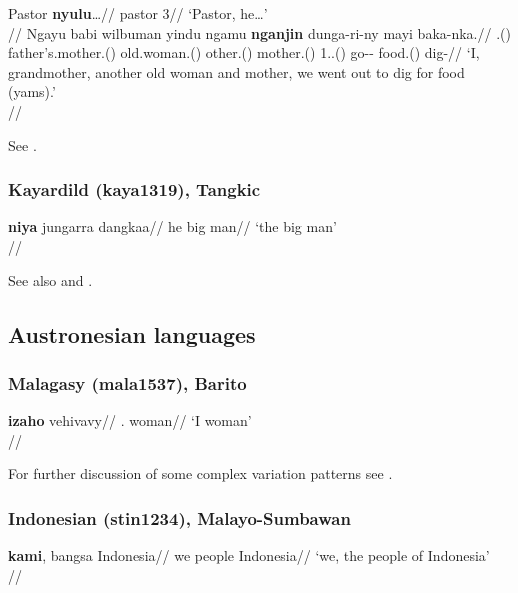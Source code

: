 \pex
\a 
\begingl
\gla Pastor \textbf{nyulu}\ldots//
\glb pastor 3\Sg{}//
\glft `Pastor, he\ldots'\\{\citep[after][202, (611); gloss extrapolated]{patz2002}}//
\endgl
\a
\begingl
\gla Ngayu babi wilbuman yindu ngamu \textbf{nganjin} dunga-ri-ny mayi baka-nka.//
\Sg{}.\Nom{}(\Sarg{}) father's.mother.\Abs{}(\Sarg) old.woman.\Abs{}(\Sarg{}) other.\Abs{}(\Sarg{}) mother.\Abs{}(\Sarg{}) 1\Pl{}.\Excl{}.\Nom{}(\Sarg{}) go-\Pl{}-\Pst{} food.\Abs{}(\Obj{}) dig-\Purp//
\glft `I, grandmother, another old woman and mother, we went out to dig for food (yams).' \\{\citep[after][203, (618)]{patz2002}}//
\endgl
\xe

See \citet[120f., 202f.]{patz2002}.

\subsubsection{Kayardild (kaya1319), Tangkic}

\ex
\begingl
\gla \textbf{niya} jungarra dangkaa//
\glb he big man//
\glft `the big man'\\\citep[239]{evans1995}//
\endgl
\xe

See also \citet[239; 251]{evans1995} and \citet[141]{round2013}.


\subsection{Austronesian languages}

\subsubsection{Malagasy (mala1537), Barito}

\ex
\begingl
\gla \textbf{izaho} vehivavy//
\Sg.\Def{} woman//
\glft `I woman'\\\citep[411, (6a)]{paultravis2019}//
\endgl
\xe

For further discussion of some complex variation patterns see \citet{paultravis2019}.
 
 
 \newpage
\subsubsection{Indonesian (stin1234), Malayo-Sumbawan}
	
\ex \begingl
\gla \textbf{kami}, bangsa Indonesia//
\glb we people Indonesia//
\glft `we, the people of Indonesia'\\\citep[170]{sneddon1996}//
\endgl
\xe

